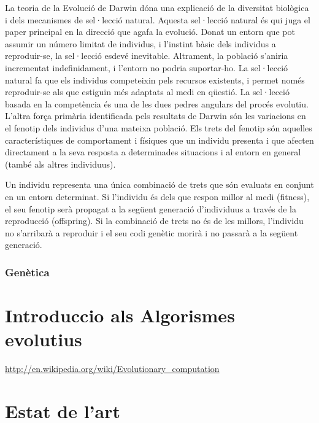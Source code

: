 \documentclass[a4paper]{article}
\begin{document}
La teoria de la Evolució de Darwin \cite{Darwin} dóna una explicació de la
diversitat biològica i dels mecanismes de sel·lecció natural.  Aquesta
sel·lecció natural és qui juga el paper principal en la direcció que agafa la
evolució.  Donat un entorn que pot assumir un número limitat de individus, i
l'instint bàsic dels individus a reproduir-se, la sel·lecció esdevé inevitable.
Altrament, la població s'aniria incrementat indefinidament, i l'entorn no podria
suportar-ho.  La sel·lecció natural fa que els individus competeixin pels
recursos existents, i permet només reproduir-se als que estiguin més adaptats al
medi en qüestió.  La sel·lecció basada en la competència és una de les dues
pedres angulars del procés evolutiu.  L'altra força primària identificada pels
resultats de Darwin són les variacions en el fenotip dels individus d'una
mateixa població. Els trets del fenotip són aquelles característiques de
comportament i físiques que un individu presenta i que afecten directament a la
seva resposta a determinades situacions i al entorn en general (també als altres
individuus).

Un individu representa una única combinació de trets que són evaluats en conjunt
en un entorn determinat.  Si l'individu és dels que respon millor al medi
(fitness), el seu fenotip serà propagat a la següent generació d'individuus a
través de la reproducció (offspring).  Si la combinació de trets no és de les
millors, l'individu no s'arribarà a reproduir i el seu codi genètic morirà i no
passarà a la següent generació.

\subsubsection{Genètica} %
\label{ssub:Genetica}




\section{Introduccio als Algorismes evolutius} %
\label{sec:Introduccio als AE}

\url{http://en.wikipedia.org/wiki/Evolutionary\_computation}



\section{Estat de l'art} %
\label{sec:Estat de l'art}
\end{document}
